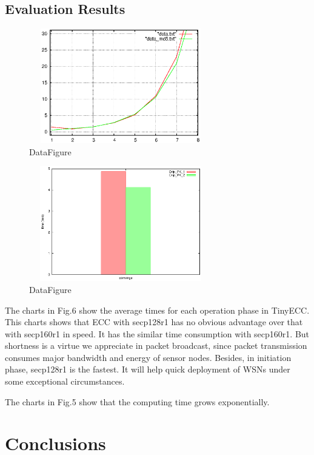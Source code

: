 \documentclass{sig-alternate-05-2015}
\begin{document}
\subsection{Evaluation Results}
\begin{figure}[ht]
\begin{center}
\includegraphics[width=8cm,height=5cm]{compare_color.eps}
\end{center}
\caption{DataFigure}\label{fig:SSDArchitecture}
\end{figure}

\begin{figure}[ht]
\begin{center}
\includegraphics[width=8cm,height=5cm]{converge.eps}
\end{center}
\caption{DataFigure}\label{fig:SSDArchitecture}
\end{figure}

The charts in Fig.6 show the average times for each operation phase in TinyECC. This charts shows that ECC with secp128r1 has no obvious advantage over that with secp160r1 in speed. It has the similar time consumption with secp160r1. But shortness is a virtue we appreciate in packet broadcast, since packet transmission consumes major bandwidth and energy of sensor nodes. Besides, in initiation phase, secp128r1 is the fastest. It will help quick deployment of WSNs under some exceptional circumstances.

The charts in Fig.5 show that the computing time grows exponentially. 

\section{Conclusions}
\end{document}
